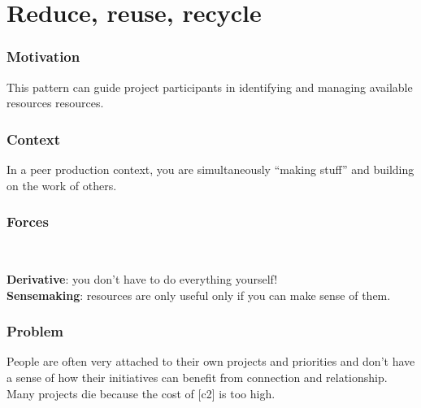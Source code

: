 \section{Reduce, reuse, recycle} \label{sec:Reduce, reuse, recycle}

\subsubsection*{Motivation} This pattern can guide project participants in identifying and managing available resources resources.


\subsubsection*{Context}
In a peer production context, you are simultaneously ``making stuff'' and building on the work of others.

\subsubsection*{Forces}~
\parbox[t]{.85\textwidth}{
\textbf{Derivative}: you don't have to do everything yourself!\\
\textbf{Sensemaking}: resources are only useful only if you can make sense of them.\\
}

\subsubsection*{Problem}
People are often very attached to their own projects and priorities and don't have a sense of how their initiatives can benefit from connection and relationship.  Many projects die because the cost of  [c2] is too high.


